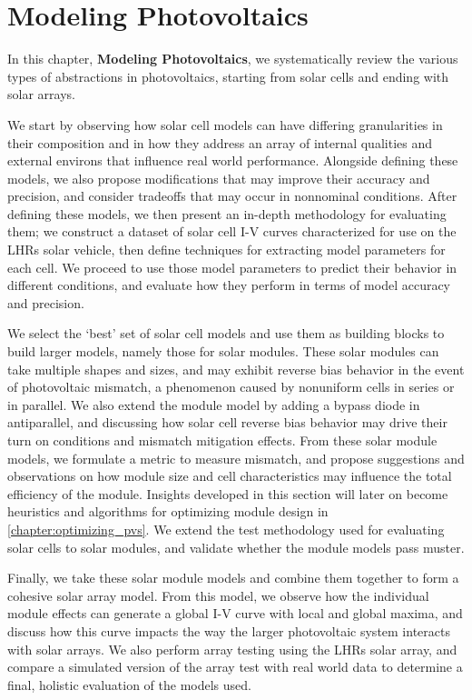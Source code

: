 \chapter{Modeling Photovoltaics}\label{chapter:modeling_pvs}

In this chapter, \textbf{Modeling Photovoltaics}, we systematically review the
various types of abstractions in photovoltaics, starting from solar cells and
ending with solar arrays.

We start by observing how solar cell models can have differing granularities in
their composition and in how they address an array of internal qualities and
external environs that influence real world performance. Alongside defining
these models, we also propose modifications that may improve their accuracy and
precision, and consider tradeoffs that may occur in nonnominal conditions. After
defining these models, we then present an in-depth methodology for evaluating
them; we construct a dataset of solar cell \ac{I-V} curves characterized for use
on the \ac{LHRs} solar vehicle, then define techniques for extracting model
parameters for each cell. We proceed to use those model parameters to predict
their behavior in different conditions, and evaluate how they perform in terms
of model accuracy and precision.

We select the `best' set of solar cell models and use them as
building blocks to build larger models, namely those for solar modules. These
solar modules can take multiple shapes and sizes, and may exhibit reverse bias
behavior in the event of photovoltaic mismatch, a phenomenon caused by
nonuniform cells in series or in parallel. We also extend the module model by
adding a bypass diode in antiparallel, and discussing how solar cell reverse
bias behavior may drive their turn on conditions and mismatch mitigation
effects. From these solar module models, we formulate a metric to measure
mismatch, and propose suggestions and observations on how module size and cell
characteristics may influence the total efficiency of the module. Insights
developed in this section will later on become heuristics and algorithms for
optimizing module design in \autoref{chapter:optimizing_pvs}. We extend the test
methodology used for evaluating solar cells to solar modules, and validate
whether the module models pass muster.


Finally, we take these solar module models and combine them together to form a
cohesive solar array model. From this model, we observe how the individual
module effects can generate a global \ac{I-V} curve with local and global
maxima, and discuss how this curve impacts the way the larger photovoltaic
system interacts with solar arrays. We also perform array testing using the
\ac{LHRs} solar array, and compare a simulated version of the array test with
real world data to determine a final, holistic evaluation of the models used.

